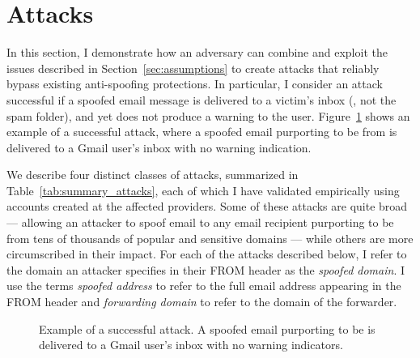
%
%

\section{Attacks}
\label{sec:attacks}
In this section, I demonstrate how an adversary can combine and
exploit the issues
described in Section~\ref{sec:assumptions} to create attacks that reliably
bypass existing anti-spoofing protections.  In particular, I consider an
attack successful if a spoofed email message is delivered to a
victim's inbox (\ie,  not the spam folder), and yet does not produce a
warning to the user.
Figure~\ref{fig:open_forwarding_attack_screenshot} shows
an example of a successful attack, where a spoofed
email purporting to be from  is delivered to a
Gmail user's inbox with no warning indication.

We describe four distinct classes of attacks, summarized in
Table~\ref{tab:summary_attacks}, each of which I have validated
empirically using accounts created at the affected providers.  Some of
these attacks are quite broad --- allowing an attacker to spoof email
to any email recipient purporting to be from tens of thousands of
popular and sensitive domains --- while others are more circumscribed
in their impact.
%
For each of the attacks described below, I refer to the domain an
attacker specifies in their \textsc{FROM} header as the
\textit{spoofed domain}.  I use the terms \textit{spoofed address} to
refer to the full email address appearing in the \textsc{FROM} header
and \textit{forwarding domain} to refer to the domain of the
forwarder.

\begin{figure}[t]
  \centering
{
    \setlength{\fboxsep}{0pt}
    \setlength{\fboxrule}{0.5pt}
}
  \caption[Example of a Successful Attack]{Example of a successful attack. A spoofed email purporting to be  is delivered to a Gmail user's inbox with no warning indicators.
}
\label{fig:open_forwarding_attack_screenshot}
\end{figure}


